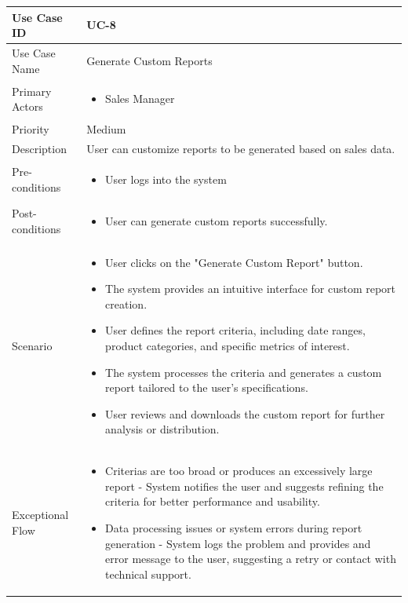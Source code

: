 \begin{tabularx}{\textwidth}{|l|X|}
\hline
Use Case ID & UC-8 \\
\hline
Use Case Name & Generate Custom Reports\\
\hline
Primary Actors & 
\begin{itemize}
    \item Sales Manager
\end{itemize} \\
\hline
Priority & Medium \\
\hline
Description & User can customize reports to be generated based on sales data. \\
\hline
Pre-conditions & 
\begin{itemize}
    \item User logs into the system
\end{itemize} \\
\hline
Post-conditions & 
\begin{itemize}
    \item User can generate custom reports successfully.
\end{itemize} \\
\hline
Scenario & 
\begin{itemize}
    \item User clicks on the "Generate Custom Report" button. 
    \item The system provides an intuitive interface for custom report creation.
    \item User defines the report criteria, including date ranges, product categories, and specific metrics of interest.
    \item The system processes the criteria and generates a custom report tailored to the user's specifications.
    \item User reviews and downloads the custom report for further analysis or distribution.
\end{itemize}\\
\hline
Exceptional Flow & 
\begin{itemize}
    \item Criterias are too broad or produces an excessively large report - System notifies the user and suggests refining the criteria for better performance and usability.
    \item Data processing issues or system errors during report generation - System logs the problem and provides and error message to the user, suggesting a retry or contact with technical support.
\end{itemize}\\
\hline
\end{tabularx}

